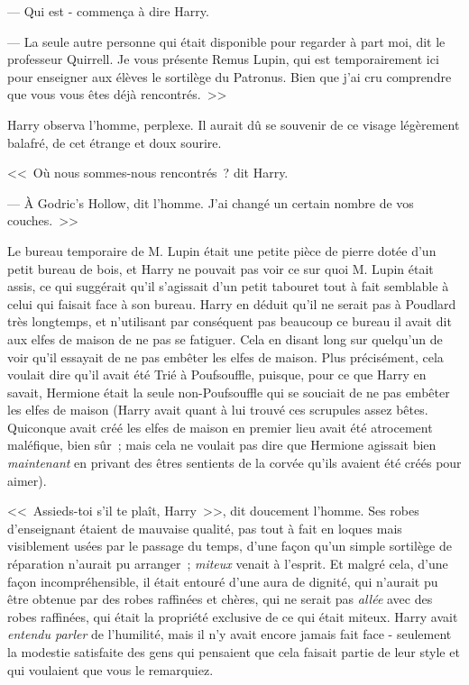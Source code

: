 --- Qui est - commença à dire Harry.

--- La seule autre personne qui était disponible pour regarder à part moi, dit le professeur Quirrell. Je vous présente Remus Lupin, qui est temporairement ici pour enseigner aux élèves le sortilège du Patronus. Bien que j'ai cru comprendre que vous vous êtes déjà rencontrés.~>>

Harry observa l'homme, perplexe. Il aurait dû se souvenir de ce visage légèrement balafré, de cet étrange et doux sourire.

<<~Où nous sommes-nous rencontrés~? dit Harry.

--- À Godric's Hollow, dit l'homme. J'ai changé un certain nombre de vos couches.~>>

\later

Le bureau temporaire de M. Lupin était une petite pièce de pierre dotée d'un petit bureau de bois, et Harry ne pouvait pas voir ce sur quoi M. Lupin était assis, ce qui suggérait qu'il s'agissait d'un petit tabouret tout à fait semblable à celui qui faisait face à son bureau. Harry en déduit qu'il ne serait pas à Poudlard très longtemps, et n'utilisant par conséquent pas beaucoup ce bureau il avait dit aux elfes de maison de ne pas se fatiguer. Cela en disant long sur quelqu'un de voir qu'il essayait de ne pas embêter les elfes de maison. Plus précisément, cela voulait dire qu'il avait été Trié à Poufsouffle, puisque, pour ce que Harry en savait, Hermione était la seule non-Poufsouffle qui se souciait de ne pas embêter les elfes de maison (Harry avait quant à lui trouvé ces scrupules assez bêtes. Quiconque avait créé les elfes de maison en premier lieu avait été atrocement maléfique, bien sûr~; mais cela ne voulait pas dire que Hermione agissait bien \emph{maintenant} en privant des êtres sentients de la corvée qu'ils avaient été créés pour aimer).

<<~Assieds-toi s'il te plaît, Harry~>>, dit doucement l'homme. Ses robes d'enseignant étaient de mauvaise qualité, pas tout à fait en loques mais visiblement usées par le passage du temps, d'une façon qu'un simple sortilège de réparation n'aurait pu arranger~; \emph{miteux} venait à l'esprit. Et malgré cela, d'une façon incompréhensible, il était entouré d'une aura de dignité, qui n'aurait pu être obtenue par des robes raffinées et chères, qui ne serait pas \emph{allée} avec des robes raffinées, qui était la propriété exclusive de ce qui était miteux. Harry avait \emph{entendu parler} de l'humilité, mais il n'y avait encore jamais fait face - seulement la modestie satisfaite des gens qui pensaient que cela faisait partie de leur style et qui voulaient que vous le remarquiez.

